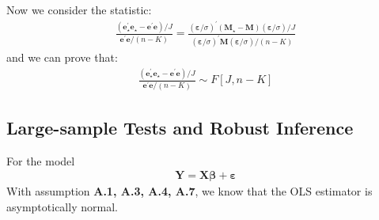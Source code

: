 \documentclass{article}
\begin{document}
Now we consider the statistic:
	\begin{align*}
		\frac{(\boldsymbol{e}^\prime_\star \boldsymbol{e}_\star - \boldsymbol{e}^\prime \boldsymbol{e}) / J}{\boldsymbol{e}^\prime \boldsymbol{e} / (n - K)} = 
		\frac{(\boldsymbol{\varepsilon} / \sigma)^\prime (\boldsymbol{M}_\star - \boldsymbol{M}) (\boldsymbol{\varepsilon} / \sigma) / J}{(\boldsymbol{\varepsilon} / \sigma)^\prime \boldsymbol{M} (\boldsymbol{\varepsilon} / \sigma) / (n - K)}
	\end{align*}	
and we can prove that:
	\begin{align*}
		\frac{(\boldsymbol{e}^\prime_\star \boldsymbol{e}_\star - \boldsymbol{e}^\prime \boldsymbol{e}) / J}{\boldsymbol{e}^\prime \boldsymbol{e} / (n - K)} \sim F[J, n - K]
	\end{align*}


\subsection{Large-sample Tests and Robust Inference}
For the model
	\begin{align*}
		\boldsymbol{Y} = \boldsymbol{X} \boldsymbol{\beta} + \boldsymbol{\varepsilon}
	\end{align*}
With assumption \textbf{A.1, A.3, A.4, A.7}, we know that the OLS estimator is asymptotically normal.
\end{document}
